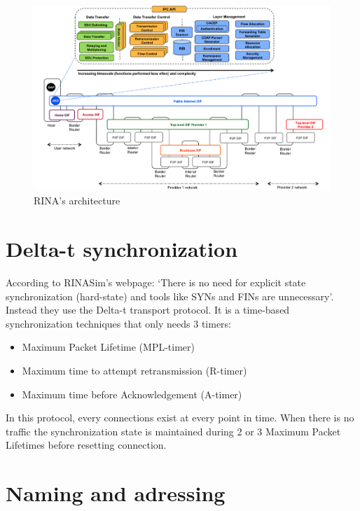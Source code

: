 \documentclass[a4paper]{proc}
\begin{document}
\begin{figure}
    \centering
    \includegraphics[width=\columnwidth]{arch.png}
    \caption{RINA's architecture}
    \label{fig:arch}
\end{figure}

\section{Delta-t synchronization}

According to RINASim's webpage: `There is no need for explicit state
synchronization (hard-state) and tools like SYNs and FINs are unnecessary'.\cite{rinasim}
Instead they use the Delta-t transport protocol\cite{65288}.  It is a time-based
synchronization techniques that only needs 3 timers:

\begin{itemize}
    \item Maximum Packet Lifetime (MPL-timer)
    \item Maximum time to attempt retransmission (R-timer)
    \item Maximum time before Acknowledgement (A-timer)
\end{itemize}

In this protocol, every connections exist at every point in time.  When there
is no traffic the synchronization state is maintained during 2 or 3 Maximum
Packet Lifetimes before resetting connection.\cite{rinasim}

\section{Naming and adressing}
\end{document}
